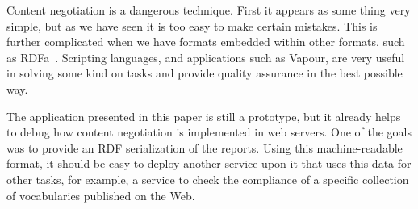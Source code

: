 \documentclass{../templates/llncs}
\begin{document}
Content negotiation is a dangerous technique. First it appears as some thing very 
simple, but as we have seen it is too easy to make certain mistakes. This is 
further complicated when we have formats embedded within other formats,
such as RDFa~\cite{Birbeck2006}. Scripting languages, and applications such as 
Vapour, are very useful in solving some kind on tasks and provide quality 
assurance in the best possible way.


The application presented in this paper is still a prototype, but  
it already helps to debug how content negotiation is implemented in web servers. One of the 
goals was to provide an RDF serialization of the reports. Using this machine-readable 
format, it should be easy to deploy another service upon it that uses this data for 
other tasks, for example, a service to check the compliance of a specific collection 
of vocabularies published on the Web.




\end{document}
